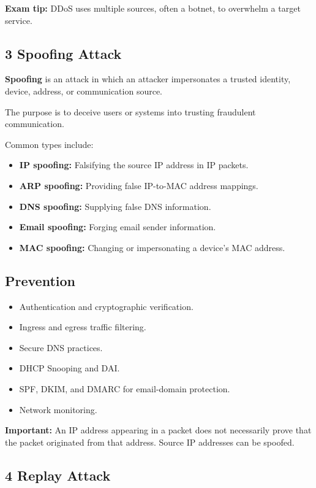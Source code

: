 \textbf{Exam tip:} DDoS uses multiple sources, often a botnet, to overwhelm a target service.

\subsection{3 Spoofing Attack}

\textbf{Spoofing} is an attack in which an attacker impersonates a trusted identity, device, address, or communication source.

The purpose is to deceive users or systems into trusting fraudulent communication.

Common types include:

\begin{itemize}
\item \textbf{IP spoofing:} Falsifying the source IP address in IP packets.
\item \textbf{ARP spoofing:} Providing false IP-to-MAC address mappings.
\item \textbf{DNS spoofing:} Supplying false DNS information.
\item \textbf{Email spoofing:} Forging email sender information.
\item \textbf{MAC spoofing:} Changing or impersonating a device's MAC address.
\end{itemize}

\subsection{Prevention}

\begin{itemize}
\item Authentication and cryptographic verification.
\item Ingress and egress traffic filtering.
\item Secure DNS practices.
\item DHCP Snooping and DAI.
\item SPF, DKIM, and DMARC for email-domain protection.
\item Network monitoring.
\end{itemize}

\textbf{Important:} An IP address appearing in a packet does not necessarily prove that the packet originated from that address. Source IP addresses can be spoofed.

\subsection{4 Replay Attack}


